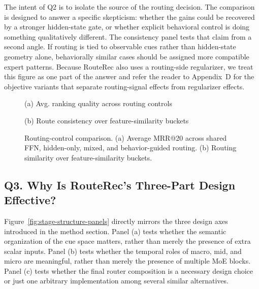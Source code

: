 \documentclass[sigconf,review,anonymous]{acmart}
\newcommand{\placeholderpanel}[1]{\fbox{\rule{0pt}{#1}\rule{0.92\linewidth}{0pt}}}
\begin{document}
The intent of Q2 is to isolate the source of the routing decision. The comparison is designed to answer a specific skepticism: whether the gains could be recovered by a stronger hidden-state gate, or whether explicit behavioral control is doing something qualitatively different. The consistency panel tests that claim from a second angle. If routing is tied to observable cues rather than hidden-state geometry alone, behaviorally similar cases should be assigned more compatible expert patterns. Because RouteRec also uses a routing-side regularizer, we treat this figure as one part of the answer and refer the reader to Appendix~D for the objective variants that separate routing-signal effects from regularizer effects.

\begin{figure}[!t]
  \centering
  \begin{minipage}[t]{0.48\columnwidth}
    \centering
    \placeholderpanel{1.25in}

    \vspace{0.35em}
    {\footnotesize (a) Avg. ranking quality across routing controls}
  \end{minipage}\hfill
  \begin{minipage}[t]{0.48\columnwidth}
    \centering
    \placeholderpanel{1.25in}

    \vspace{0.35em}
    {\footnotesize (b) Route consistency over feature-similarity buckets}
  \end{minipage}
  \caption{Routing-control comparison. (a) Average MRR@20 across shared FFN, hidden-only, mixed, and behavior-guided routing. (b) Routing similarity over feature-similarity buckets.}
  \label{fig:routing-control-panels}
\end{figure}

\subsection{Q3. Why Is RouteRec's Three-Part Design Effective?}
\label{sec:stage-structure}
Figure~\ref{fig:stage-structure-panels} directly mirrors the three design axes introduced in the method section. Panel (a) tests whether the semantic organization of the cue space matters, rather than merely the presence of extra scalar inputs. Panel (b) tests whether the temporal roles of macro, mid, and micro are meaningful, rather than merely the presence of multiple MoE blocks. Panel (c) tests whether the final router composition is a necessary design choice or just one arbitrary implementation among several similar alternatives.
\end{document}
